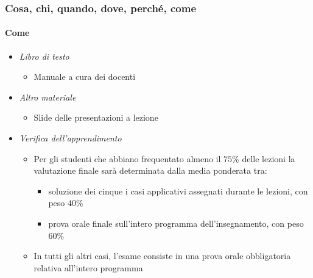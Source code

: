 \documentclass[trans]{beamer}%
\newenvironment{stepitemize}{\begin{itemize}[<+->]}{\end{itemize} }
\begin{document}
\begin{frame}%
%

\frametitle{Cosa, chi, quando, dove, perch\'{e}, come}%
%

\framesubtitle{Come}%
%

%


\begin{stepitemize}
\item \textit{Libro di testo}

\begin{stepitemize}
\item Manuale a cura dei docenti
\end{stepitemize}

\item \textit{Altro materiale}

\begin{stepitemize}
\item Slide delle presentazioni a lezione
\end{stepitemize}

\item \textit{Verifica dell'apprendimento}

\begin{stepitemize}
\item Per gli studenti che abbiano frequentato almeno il $75\%$ delle lezioni
la valutazione finale sar\`{a} determinata dalla media ponderata tra:

\begin{stepitemize}
\item soluzione dei cinque i casi applicativi assegnati durante le lezioni,
con peso $40\%$

\item prova orale finale sull'intero programma dell'insegnamento, con peso
$60\%$
\end{stepitemize}

\item In tutti gli altri casi, l'esame consiste in una prova orale
obbligatoria relativa all'intero programma
\end{stepitemize}
\end{stepitemize}

%

\transboxout
\end{frame}%
\end{document}
